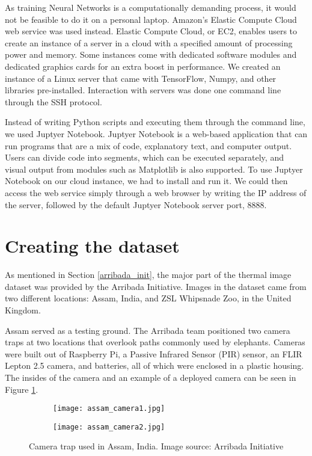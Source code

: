 As training Neural Networks is a computationally demanding process, it would not be feasible to do it on a personal laptop.
Amazon's Elastic Compute Cloud web service was used instead.
Elastic Compute Cloud, or EC2, enables users to create an instance of a server in a cloud with a specified amount of processing power and memory.
Some instances come with dedicated software modules and dedicated graphics cards for an extra boost in performance.
We created an instance of a Linux server that came with TensorFlow, Numpy, and other libraries pre-installed.
Interaction with servers was done one command line through the SSH protocol.

Instead of writing Python scripts and executing them through the command line, we used Juptyer Notebook. 
Juptyer Notebook is a web-based application that can run programs that are a mix of code, explanatory text, and computer output.
Users can divide code into segments, which can be executed separately, and visual output from modules such as Matplotlib is also supported.
To use Juptyer Notebook on our cloud instance, we had to install and run it.
We could then access the web service simply through a web browser by writing the IP address of the server, followed by the default Juptyer Notebook server port, 8888.


\section{ Creating the dataset}

As mentioned in Section \ref{arribada_init}, the major part of the thermal image dataset was provided by the Arribada Initiative\cite{wildlabs-winners}\cite{arribada-assam}.
Images in the dataset came from two different locations: Assam, India, and ZSL Whipsnade Zoo, in the United Kingdom.

Assam served as a testing ground.
The Arribada team positioned two camera traps at two locations that overlook paths commonly used by elephants.
Cameras were built out of Raspberry Pi, a Passive Infrared Sensor (PIR) sensor, an FLIR Lepton 2.5 camera, and batteries, all of which were enclosed in a plastic housing.
The insides of the camera and an example of a deployed camera can be seen in Figure \ref{assam_camera}.

\begin{figure}[ht]
    \begin{subfigure}{0.5\textwidth}
        \centering
        \texttt{[image: assam\_camera1.jpg]} 
    \end{subfigure}
    \begin{subfigure}{0.5\textwidth}
        \centering
        \texttt{[image: assam\_camera2.jpg]}
    \end{subfigure}
    \caption[Camera trap used in Assam, India.]{Camera trap used in Assam, India. Image source: Arribada Initiative\cite{arribada-assam}}
    \label{assam_camera}
\end{figure}

